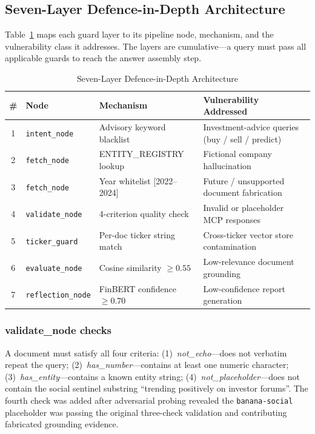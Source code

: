 \documentclass[10pt,journal,compsoc]{IEEEtran}
\newcommand{\node}[1]{\texttt{#1}}
\begin{document}
\subsection{Seven-Layer Defence-in-Depth Architecture}

Table~\ref{tab:guards} maps each guard layer to its pipeline node,
mechanism, and the vulnerability class it addresses.
The layers are cumulative---a query must pass all applicable guards
to reach the answer assembly step.

\begin{table}[htbp]
\caption{Seven-Layer Defence-in-Depth Architecture}
\label{tab:guards}
\centering
\small
\begin{tabular}{@{}c p{2.8cm} p{4cm} p{5cm}@{}}
\toprule
\textbf{\#} & \textbf{Node} & \textbf{Mechanism} &
\textbf{Vulnerability Addressed} \\
\midrule
1 & \node{intent\_node}     & Advisory keyword blacklist    & Investment-advice queries (buy / sell / predict) \\
2 & \node{fetch\_node}      & ENTITY\_REGISTRY lookup       & Fictional company hallucination \\
3 & \node{fetch\_node}      & Year whitelist [2022--2024]   & Future / unsupported document fabrication \\
4 & \node{validate\_node}   & 4-criterion quality check     & Invalid or placeholder MCP responses \\
5 & \node{ticker\_guard}    & Per-doc ticker string match   & Cross-ticker vector store contamination \\
6 & \node{evaluate\_node}   & Cosine similarity $\geq 0.55$ & Low-relevance document grounding \\
7 & \node{reflection\_node} & FinBERT confidence $\geq 0.70$& Low-confidence report generation \\
\bottomrule
\end{tabular}
\end{table}

\subsubsection{validate\_node checks}
A document must satisfy all four criteria:
(1)~\textit{not\_echo}---does not verbatim repeat the query;
(2)~\textit{has\_number}---contains at least one numeric character;
(3)~\textit{has\_entity}---contains a known entity string;
(4)~\textit{not\_placeholder}---does not contain the social sentinel
substring ``trending positively on investor forums''.
The fourth check was added after adversarial probing revealed the
\node{banana-social} placeholder was passing the original three-check
validation and contributing fabricated grounding evidence.
\end{document}
